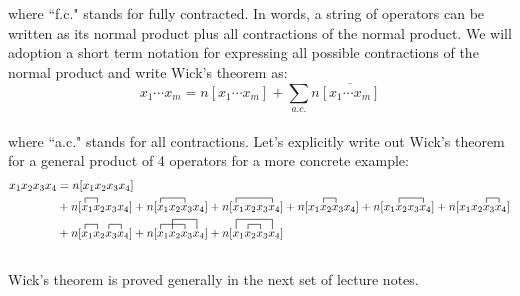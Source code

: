 \documentclass{article}
\newcommand{\ol}{\overline}
\newcommand{\ctr}{\contraction}
\newcommand{\cd}{\ensuremath{\cdots} }
\begin{document}
where ``f.c." stands for fully contracted. 
In words, a string of operators can be written as its normal product plus all contractions of the normal product. 
We will adoption a short term notation for expressing all possible contractions of the normal product and write Wick's theorem as: 
\[x_1 \cd x_m = n[x_1 \cd x_m ]  + \sum_{a.c.} n\ol{[x_1 \cd x_m ]} \]\\
where ``a.c." stands for all contractions.
Let's explicitly write out Wick's theorem for a general product of 4 operators for a more concrete example: 
\begin{align*}
x_1x_2x_3x_4 &= n[x_1x_2x_3x_4 ] \\ 
&+n[ \ctr{}{x}{{}_1}{x} x_1x_2x_3x_4 ] + n[ \ctr{}{x}{{}_1x_2}{x} x_1x_2x_3x_4 ] + n[ \ctr{}{x}{{}_1x_2 x_3}{x} x_1x_2x_3x_4 ] 
+ n[ \ctr{x_1}{x}{{}_2}{x} x_1x_2x_3x_4 ] +  n[ \ctr{x_1}{x}{{}_2 x_3}{x} x_1x_2x_3x_4 ] + n[ \ctr{x_1 x_2}{x}{{}_3}{x} x_1x_2x_3x_4 ] \\
&+ n[ \ctr{}{x}{{}_1}{x}  \ctr{x_1 x_2}{x}{{}_3}{x} x_1x_2x_3x_4 ]
+ n[ \ctr{}{x}{{}_1x_2}{x}  \ctr[2ex]{x_1}{x}{{}_2 x_3}{x} x_1x_2x_3x_4 ] 
+ n[ \ctr{x_1}{x}{{}_2}{x} \ctr[2ex]{}{x}{{}_1x_2 x_3}{x}      x_1x_2x_3x_4 ] 
\end{align*}
\\
Wick's theorem is proved generally in the next set of lecture notes.
\end{document}

